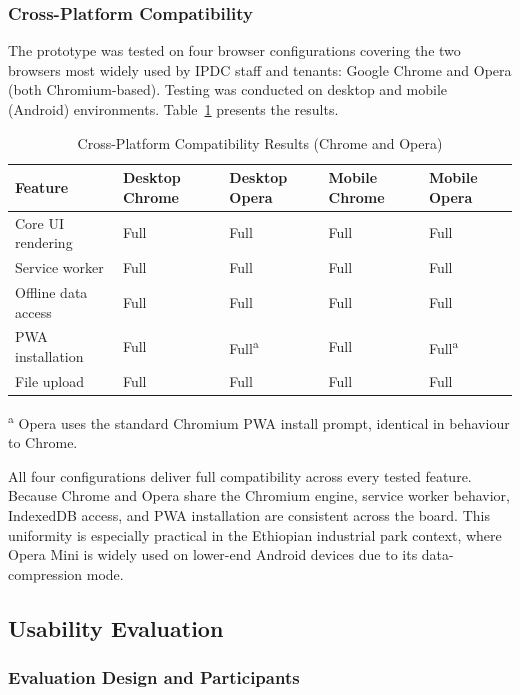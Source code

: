 \subsubsection{Cross-Platform Compatibility}

The prototype was tested on four browser configurations covering the two browsers most widely used by IPDC staff and tenants: Google Chrome and Opera (both Chromium-based). Testing was conducted on desktop and mobile (Android) environments. Table~\ref{tab:cross-platform} presents the results.

\begin{table}[H]
\centering
\caption{Cross-Platform Compatibility Results (Chrome and Opera)}
\label{tab:cross-platform}
\small
\begin{tabular}{p{3.2cm}llll}
\toprule
\textbf{Feature} & \textbf{Desktop Chrome} & \textbf{Desktop Opera} & \textbf{Mobile Chrome} & \textbf{Mobile Opera} \\
\midrule
Core UI rendering & Full & Full & Full & Full \\
Service worker & Full & Full & Full & Full \\
Offline data access & Full & Full & Full & Full \\
PWA installation & Full & Full\textsuperscript{a} & Full & Full\textsuperscript{a} \\
File upload & Full & Full & Full & Full \\
\bottomrule
\end{tabular}
\vspace{0.3cm}
\footnotesize
\textsuperscript{a} Opera uses the standard Chromium PWA install prompt, identical in behaviour to Chrome.
\end{table}

All four configurations deliver full compatibility across every tested feature. Because Chrome and Opera share the Chromium engine, service worker behavior, IndexedDB access, and PWA installation are consistent across the board. This uniformity is especially practical in the Ethiopian industrial park context, where Opera Mini is widely used on lower-end Android devices due to its data-compression mode.

\subsection{Usability Evaluation}

\subsubsection{Evaluation Design and Participants}

